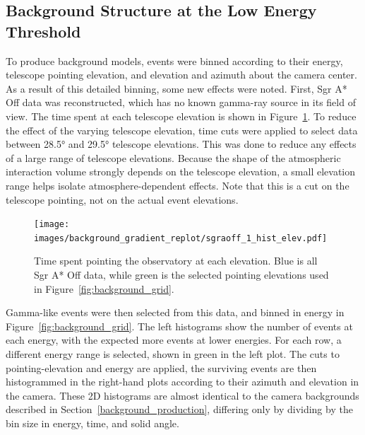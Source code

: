 {  \subsection{Background Structure at the Low Energy Threshold}\label{subsec:bkgstructure}
    To produce background models, events were binned according to their energy, telescope pointing elevation, and elevation and azimuth about the camera center.
    As a result of this detailed binning, some new effects were noted.
    First, Sgr A* Off data was reconstructed, which has no known gamma-ray source in its field of view.
    The time spent at each telescope elevation is shown in Figure~\ref{fig:back_elevhist}.
    To reduce the effect of the varying telescope elevation, time cuts were applied to select data between \ang{28.5} and \ang{29.5} telescope elevations.
    This was done to reduce any effects of a large range of telescope elevations.
    Because the shape of the atmospheric interaction volume strongly depends on the telescope elevation, a small elevation range helps isolate atmosphere-dependent effects.
    Note that this is a cut on the telescope pointing, not on the actual event elevations.

    \begin{figure}[bt]
      \centering
      \texttt{[image: images/background\_gradient\_replot/sgraoff\_1\_hist\_elev.pdf]}
      \caption[Elevation Slice of Sgr A* Off data]{
        Time spent pointing the observatory at each elevation.
        Blue is all Sgr A* Off data, while green is the selected pointing elevations used in Figure~\ref{fig:background_grid}.
      }
      \label{fig:back_elevhist}
    \end{figure}
    
    Gamma-like events were then selected from this data, and binned in energy in Figure~\ref{fig:background_grid}.
    The left histograms show the number of events at each energy, with the expected more events at lower energies.
    For each row, a different energy range is selected, shown in green in the left plot.
    The cuts to pointing-elevation  and energy are applied, the surviving events are then histogrammed in the right-hand plots according to their azimuth and elevation in the camera.
    These 2D histograms are almost identical to the camera backgrounds described in Section~\ref{background_production}, differing only by dividing by the bin size in energy, time, and solid angle.
    
}
